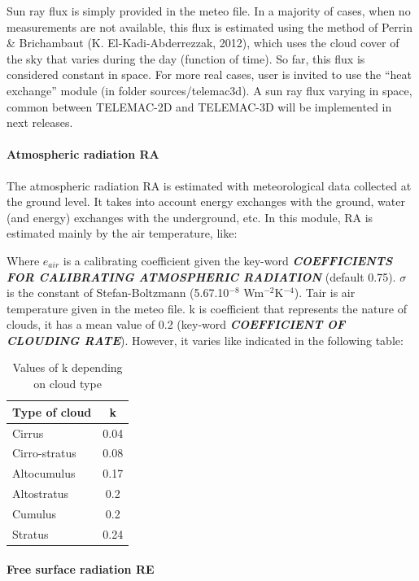 Sun ray flux is simply provided in the meteo file. In a majority of cases, when no measurements are not available, this flux is estimated using the method of Perrin \& Brichambaut (K. El-Kadi-Abderrezzak, 2012), which uses the cloud cover of the sky that varies during the day (function of time). So far, this flux is considered constant in space.  For more real cases, user is invited to use the ``heat exchange'' module (in folder sources/telemac3d). A sun ray flux varying in space, common between TELEMAC-2D and TELEMAC-3D will be implemented in next releases.


\paragraph{ Atmospheric radiation RA}

 The atmospheric radiation RA is estimated with meteorological data collected at the ground level. It takes into account energy exchanges with the ground, water (and energy) exchanges with the underground, etc. In this module, RA is estimated mainly by the air temperature, like:

 Where $e_{air}$ is a calibrating coefficient given the key-word \textbf{\textit{COEFFICIENTS FOR CALIBRATING ATMOSPHERIC RADIATION} }(default 0.75). $\sigma$ is the constant of Stefan-Boltzmann (5.67.10${}^{-8}$ Wm${}^{-2}$K${}^{-4}$). Tair is air temperature given in the meteo file. k is coefficient that represents the nature of clouds, it has a mean value of 0.2 (key-word \textbf{\textit{COEFFICIENT OF CLOUDING RATE}}). However, it varies like indicated in the following table:
\begin{table}
  \centering
  \begin{tabular}{|l|c|}
     \hline 
     Type of cloud & k \\
     \hline \hline
     Cirrus & 0.04 \\
     Cirro-stratus & 0.08 \\
     Altocumulus & 0.17 \\
     Altostratus & 0.2 \\
     Cumulus & 0.2 \\
     Stratus & 0.24\\
     \hline 
   \end{tabular}
  \caption{Values of k depending on cloud type}\label{kcloud}
\end{table}



\paragraph{  Free surface radiation RE}

